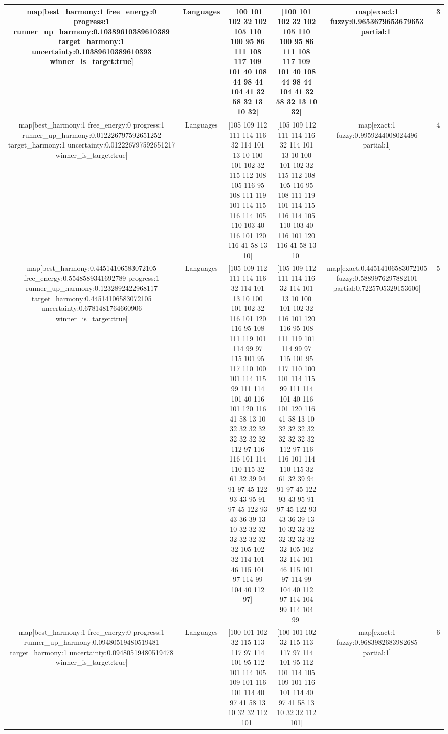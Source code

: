 \begin{table}[h]
\begin{tabular}{ |c|c|c|c|c|c| }
\hline
map[best_harmony:1 free_energy:0 progress:1 runner_up_harmony:0.10389610389610389 target_harmony:1 uncertainty:0.10389610389610393 winner_is_target:true] & Languages & [100 101 102 32 102 105 110 100 95 86 111 108 117 109 101 40 108 44 98 44 104 41 32 58 32 13 10 32] & [100 101 102 32 102 105 110 100 95 86 111 108 117 109 101 40 108 44 98 44 104 41 32 58 32 13 10 32] & map[exact:1 fuzzy:0.9653679653679653 partial:1] & 3 \\
\hline
map[best_harmony:1 free_energy:0 progress:1 runner_up_harmony:0.012226797592651252 target_harmony:1 uncertainty:0.012226797592651217 winner_is_target:true] & Languages & [105 109 112 111 114 116 32 114 101 13 10 100 101 102 32 115 112 108 105 116 95 108 111 119 101 114 115 116 114 105 110 103 40 116 101 120 116 41 58 13 10] & [105 109 112 111 114 116 32 114 101 13 10 100 101 102 32 115 112 108 105 116 95 108 111 119 101 114 115 116 114 105 110 103 40 116 101 120 116 41 58 13 10] & map[exact:1 fuzzy:0.9959244008024496 partial:1] & 4 \\
\hline
map[best_harmony:0.44514106583072105 free_energy:0.5548589341692789 progress:1 runner_up_harmony:0.1232892422968117 target_harmony:0.44514106583072105 uncertainty:0.6781481764660906 winner_is_target:true] & Languages & [105 109 112 111 114 116 32 114 101 13 10 100 101 102 32 116 101 120 116 95 108 111 119 101 114 99 97 115 101 95 117 110 100 101 114 115 99 111 114 101 40 116 101 120 116 41 58 13 10 32 32 32 32 32 32 32 32 112 97 116 116 101 114 110 115 32 61 32 39 94 91 97 45 122 93 43 95 91 97 45 122 93 43 36 39 13 10 32 32 32 32 32 32 32 32 105 102 32 114 101 46 115 101 97 114 99 104 40 112 97] & [105 109 112 111 114 116 32 114 101 13 10 100 101 102 32 116 101 120 116 95 108 111 119 101 114 99 97 115 101 95 117 110 100 101 114 115 99 111 114 101 40 116 101 120 116 41 58 13 10 32 32 32 32 32 32 32 32 112 97 116 116 101 114 110 115 32 61 32 39 94 91 97 45 122 93 43 95 91 97 45 122 93 43 36 39 13 10 32 32 32 32 32 32 32 32 105 102 32 114 101 46 115 101 97 114 99 104 40 112 97 114 104 99 114 104 99] & map[exact:0.44514106583072105 fuzzy:0.5889976297882101 partial:0.7225705329153606] & 5 \\
\hline
map[best_harmony:1 free_energy:0 progress:1 runner_up_harmony:0.09480519480519481 target_harmony:1 uncertainty:0.09480519480519478 winner_is_target:true] & Languages & [100 101 102 32 115 113 117 97 114 101 95 112 101 114 105 109 101 116 101 114 40 97 41 58 13 10 32 32 112 101] & [100 101 102 32 115 113 117 97 114 101 95 112 101 114 105 109 101 116 101 114 40 97 41 58 13 10 32 32 112 101] & map[exact:1 fuzzy:0.9683982683982685 partial:1] & 6 \\

\end{tabular}
\end{table}
